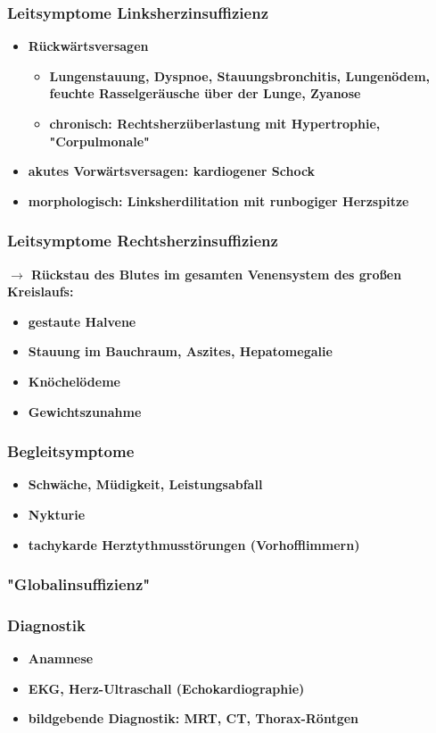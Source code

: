 		\subsubsection{Leitsymptome Linksherzinsuffizienz}
			\begin{itemize}
				\item \textbf{Rückwärtsversagen}
					\begin{itemize}
						\item \textbf{Lungenstauung, Dyspnoe, Stauungsbronchitis, Lungenödem, feuchte Rasselgeräusche über der Lunge, Zyanose}
						\item \textbf{chronisch: Rechtsherzüberlastung mit Hypertrophie, "Corpulmonale"}
					\end{itemize}
				\item \textbf{akutes Vorwärtsversagen: kardiogener Schock}
				\item \textbf{morphologisch: Linksherdilitation mit runbogiger Herzspitze}
			\end{itemize}
		\subsubsection{Leitsymptome Rechtsherzinsuffizienz}
			\textbf{$\rightarrow$ Rückstau des Blutes im gesamten Venensystem des großen Kreislaufs:}
			\begin{itemize}
				\item \textbf{gestaute Halvene}
				\item \textbf{Stauung im Bauchraum, Aszites, Hepatomegalie}
				\item \textbf{Knöchelödeme}
				\item \textbf{Gewichtszunahme}
			\end{itemize}
		\subsubsection{Begleitsymptome}
			\begin{itemize}
				\item \textbf{Schwäche, Müdigkeit, Leistungsabfall}
				\item \textbf{Nykturie}
				\item \textbf{tachykarde Herztythmusstörungen (Vorhofflimmern)}
			\end{itemize}
		\subsubsection{"Globalinsuffizienz"}
		\subsubsection{Diagnostik}
			\begin{itemize}
				\item \textbf{Anamnese}
				\item \textbf{EKG, Herz-Ultraschall (Echokardiographie)}
				\item \textbf{bildgebende Diagnostik: MRT, CT, Thorax-Röntgen}
			\end{itemize}
